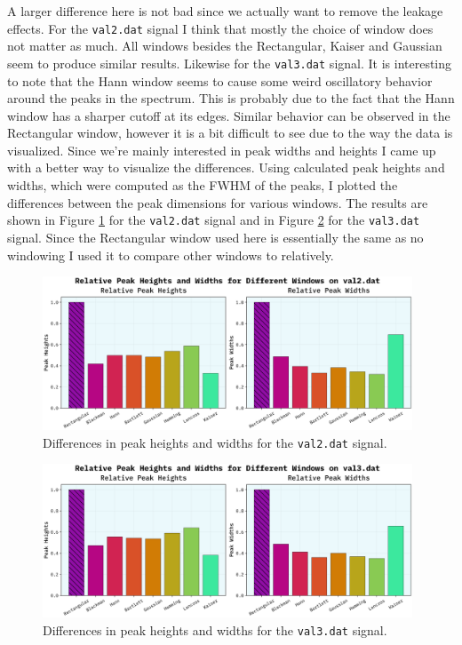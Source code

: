 \documentclass[10pt, titlepage, a4paper]{article}
\begin{document}
A larger difference here is not bad since we actually want to remove the leakage effects. For the \texttt{val2.dat} signal
I think that mostly the choice of window does not matter as much. All windows besides the Rectangular, Kaiser and Gaussian seem 
to produce similar results. Likewise for the \texttt{val3.dat} signal. It is interesting to note that the Hann window seems to 
cause some weird oscillatory behavior around the peaks in the spectrum. This is probably due to the fact that the Hann window has 
a sharper cutoff at its edges. Similar behavior can be observed in the Rectangular window, however it is a bit difficult to see 
due to the way the data is visualized. Since we're mainly interested in peak widths and heights I came up with a better way to 
visualize the differences. Using calculated peak heights and widths, which were computed as the FWHM of the peaks,
I plotted the differences between the peak dimensions for various windows. The results are shown in Figure \ref{fig:peak-differences-2} 
for the \texttt{val2.dat} signal and in Figure \ref{fig:peak-differences-3} for the \texttt{val3.dat} signal. Since the Rectangular
window used here is essentially the same as no windowing I used it to compare other windows to relatively.

\begin{figure}[H]
    \centering
    \includegraphics[width=0.98\textwidth]{../SpectralAnalysis/Images/peak-widths-val2.dat.png}
    \caption{Differences in peak heights and widths for the \texttt{val2.dat} signal.}
    \label{fig:peak-differences-2}
\end{figure}

\begin{figure}[H]
    \centering
    \includegraphics[width=0.98\textwidth]{../SpectralAnalysis/Images/peak-widths-val3.dat.png}
    \caption{Differences in peak heights and widths for the \texttt{val3.dat} signal.}
    \label{fig:peak-differences-3}
\end{figure}
\end{document}
